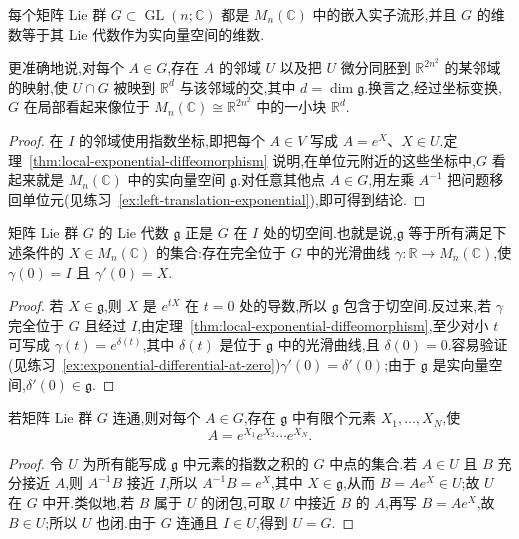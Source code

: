 {\begin{corollary}\label{cor:matrix-lie-embedded-submanifold}
每个矩阵 Lie 群 $G\subset\operatorname{GL}(n;\mathbb C)$ 都是 $M_n(\mathbb C)$ 中的嵌入实子流形,并且 $G$ 的维数等于其 Lie 代数作为实向量空间的维数.
\end{corollary}

更准确地说,对每个 $A\in G$,存在 $A$ 的邻域 $U$ 以及把 $U$ 微分同胚到 $\mathbb R^{2n^2}$ 的某邻域的映射,使 $U\cap G$ 被映到 $\mathbb R^{d}$ 与该邻域的交,其中 $d=\dim\mathfrak g$.换言之,经过坐标变换,$G$ 在局部看起来像位于 $M_n(\mathbb C)\cong\mathbb R^{2n^2}$ 中的一小块 $\mathbb R^d$.

\begin{proof}
在 $I$ 的邻域使用指数坐标,即把每个 $A\in V$ 写成 $A=e^X$、$X\in U$.定理~\ref{thm:local-exponential-diffeomorphism} 说明,在单位元附近的这些坐标中,$G$ 看起来就是 $M_n(\mathbb C)$ 中的实向量空间 $\mathfrak g$.对任意其他点 $A\in G$,用左乘 $A^{-1}$ 把问题移回单位元(见练习~\ref{ex:left-translation-exponential}),即可得到结论.
\end{proof}

\begin{corollary}\label{cor:tangent-space-lie-algebra}
矩阵 Lie 群 $G$ 的 Lie 代数 $\mathfrak g$ 正是 $G$ 在 $I$ 处的切空间.也就是说,$\mathfrak g$ 等于所有满足下述条件的 $X\in M_n(\mathbb C)$ 的集合:存在完全位于 $G$ 中的光滑曲线 $\gamma:\mathbb R\to M_n(\mathbb C)$,使 $\gamma(0)=I$ 且 $\gamma'(0)=X$.
\end{corollary}

\begin{proof}
若 $X\in\mathfrak g$,则 $X$ 是 $e^{tX}$ 在 $t=0$ 处的导数,所以 $\mathfrak g$ 包含于切空间.反过来,若 $\gamma$ 完全位于 $G$ 且经过 $I$,由定理~\ref{thm:local-exponential-diffeomorphism},至少对小 $t$ 可写成 $\gamma(t)=e^{\delta(t)}$,其中 $\delta(t)$ 是位于 $\mathfrak g$ 中的光滑曲线,且 $\delta(0)=0$.容易验证(见练习~\ref{ex:exponential-differential-at-zero})$\gamma'(0)=\delta'(0)$;由于 $\mathfrak g$ 是实向量空间,$\delta'(0)\in\mathfrak g$.
\end{proof}

\begin{corollary}[连通群由指数生成]\label{cor:connected-group-products-exponentials}
若矩阵 Lie 群 $G$ 连通,则对每个 $A\in G$,存在 $\mathfrak g$ 中有限个元素 $X_1,\ldots,X_N$,使
\[
A=e^{X_1}e^{X_2}\cdots e^{X_N}.
\]
\end{corollary}

\begin{proof}
令 $U$ 为所有能写成 $\mathfrak g$ 中元素的指数之积的 $G$ 中点的集合.若 $A\in U$ 且 $B$ 充分接近 $A$,则 $A^{-1}B$ 接近 $I$,所以 $A^{-1}B=e^X$,其中 $X\in\mathfrak g$,从而 $B=Ae^X\in U$;故 $U$ 在 $G$ 中开.类似地,若 $B$ 属于 $U$ 的闭包,可取 $U$ 中接近 $B$ 的 $A$,再写 $B=Ae^X$,故 $B\in U$;所以 $U$ 也闭.由于 $G$ 连通且 $I\in U$,得到 $U=G$.
\end{proof}

}
